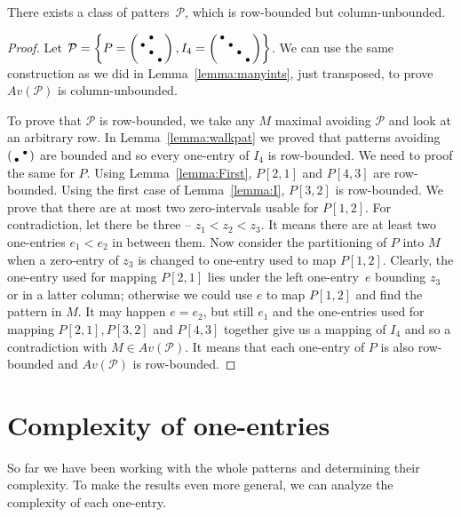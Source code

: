 \begin{lemma}
There exists a class of patters~$\mathcal{P}$, which is row-bounded but column-unbounded.
\end{lemma}
\begin{proof}
Let $\mathcal{P}=\left\lbrace P=\left(\begin{smallmatrix} &\bullet& \\\bullet& & \\ &\bullet& \\ & &\bullet\end{smallmatrix}\right),I_4=\left(\begin{smallmatrix}\bullet& & & \\ &\bullet& & \\ & &\bullet& \\ & & &\bullet\end{smallmatrix}\right)\right\rbrace$. We can use the same construction as we did in Lemma~\ref{lemma:manyints}, just transposed, to prove $Av(\mathcal{P})$ is column-unbounded.

To prove that $\mathcal{P}$ is row-bounded, we take any $M$ maximal avoiding $\mathcal{P}$ and look at an arbitrary row. In Lemma~\ref{lemma:walkpat} we proved that patterns avoiding $\left(\begin{smallmatrix} &\bullet\\\bullet& \end{smallmatrix}\right)$ are bounded and so every one-entry of $I_4$ is row-bounded. We need to proof the same for $P$. Using Lemma~\ref{lemma:First}, $P[2,1]$ and $P[4,3]$ are row-bounded. Using the first case of Lemma~\ref{lemma:I}, $P[3,2]$ is row-bounded. We prove that there are at most two zero-intervals usable for $P[1,2]$. For contradiction, let there be three -- $z_1<z_2<z_3$. It means there are at least two one-entries $e_1<e_2$ in between them. Now consider the partitioning of $P$ into $M$ when a zero-entry of $z_3$ is changed to one-entry used to map $P[1,2]$. Clearly, the one-entry used for mapping $P[2,1]$ lies under the left one-entry~$e$ bounding $z_3$ or in a latter column; otherwise we could use $e$ to map $P[1,2]$ and find the pattern in $M$. It may happen $e=e_2$, but still $e_1$ and the one-entries used for mapping $P[2,1],P[3,2]$ and $P[4,3]$ together give us a mapping of $I_4$ and so a contradiction with $M\in Av(\mathcal{P})$. It means that each one-entry of $P$ is also row-bounded and $Av(\mathcal{P})$ is row-bounded.
\end{proof}

\section{Complexity of one-entries}
So far we have been working with the whole patterns and determining their complexity. To make the results even more general, we can analyze the complexity of each one-entry.

